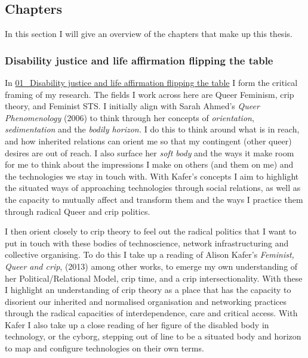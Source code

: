\hypertarget{chapters}{%
\subsection[Chapters]{\texorpdfstring{\protect\hypertarget{anchor}{}{}Chapters}{Chapters}}\label{chapters}}

In this section I will give an overview of the chapters that make up
this thesis.

\hypertarget{disability-justice-and-life-affirmation-flipping-the-table}{%
\subsubsection[Disability justice and life affirmation flipping the
table]{\texorpdfstring{\protect\hypertarget{anchor}{}{}Disability
justice and life affirmation flipping the
table}{Disability justice and life affirmation flipping the table}}\label{disability-justice-and-life-affirmation-flipping-the-table}}

In
\href{../../01_Disability_justice_and_life_affirmation_flipping_the_table/01_Disability\%20justice\%20and\%20life\%20affirmation\%20flipping\%20the\%20table.md}{01\_Disability
justice and life affirmation flipping the table} I form the critical
framing of my research. The fields I work across here are Queer
Feminism, crip theory, and Feminist STS. I initially align with Sarah
Ahmed's \emph{Queer Phenomenology} (2006) to think through her concepts
of \emph{orientation}, \emph{sedimentation} and the \emph{bodily
horizon.} I do this to think around what is in reach, and how inherited
relations can orient me so that my contingent (other queer) desires are
out of reach. I also surface her \emph{soft body} and the ways it make
room for me to think about the impressions I make on others (and them on
me) and the technologies we stay in touch with. With Kafer's concepts I
aim to highlight the situated ways of approaching technologies through
social relations, as well as the capacity to mutually affect and
transform them and the ways I practice them through radical Queer and
crip politics.

I then orient closely to crip theory to feel out the radical politics
that I want to put in touch with these bodies of technoscience, network
infrastructuring and collective organising. To do this I take up a
reading of Alison Kafer's \emph{Feminist, Queer and crip}, (2013) among
other works, to emerge my own understanding of her Political/Relational
Model, crip time, and a crip intersectionality. With these I highlight
an understanding of crip theory as a place that has the capacity to
disorient our inherited and normalised organisation and networking
practices through the radical capacities of interdependence, care and
critical access. With Kafer I also take up a close reading of her figure
of the disabled body in technology, or the cyborg, stepping out of line
to be a situated body and horizon to map and configure technologies on
their own terms.

